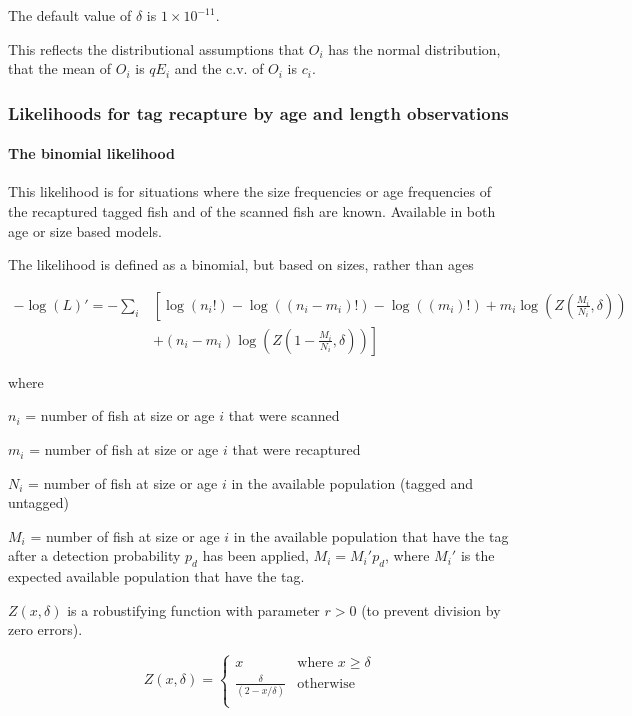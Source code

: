 The default value of $\delta$ is $1 \times 10^{-11}$.

This reflects the distributional assumptions that  $O_i$ has the normal distribution, that the mean of $O_i$ is $qE_i$  and the c.v. of $O_i$ is $c_i$.

\subsubsection{Likelihoods for tag recapture by age and length observations}
\paragraph*{The binomial likelihood}

This likelihood is for situations where the size frequencies or age frequencies of the recaptured tagged fish and of the scanned fish are known. Available in both age or size based models.

The likelihood is defined as a binomial, but based on sizes, rather than ages

\begin{equation}
\begin{split}
-\log \left(L \right)'= -\sum\limits_i & \left[ \right. \log \left(n_i! \right) - \log \left(\left(n_i - m_i \right)! \right) - \log \left(\left(m_i \right)! \right) + m_i \log \left(Z\left(\frac{M_i}{N_i},\delta \right) \right) \\
&+  \left(n_i - m_i \right)\log \left(Z\left(1 - \frac{M_i}{N_i},\delta\right) \right) \left. \right]
\end{split}
\end{equation}

where

$n_i$ = number of fish at size or age $i$ that were scanned

$m_i$ = number of fish at size or age $i$ that were recaptured

$N_i$ = number of fish at size or age $i$ in the available population (tagged and untagged)

$M_i$ = number of fish at size or age $i$ in the available population that have the tag after a detection probability $p_d$ has been applied, $M_i = M_i'p_d$, where $M_i'$ is the expected available population that have the tag.

$Z(x,\delta)$ is a robustifying function with parameter $r > 0$ (to prevent division by zero errors).

\[ Z(x,\delta) =
\begin{cases}
x       & \text{where } x \geq \delta\\
\frac{\delta}{(2 - x / \delta)}  & \text{otherwise}\\
\end{cases}
\]

